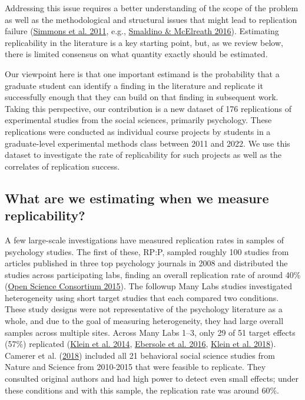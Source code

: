 \documentclass[
  english,
  a4paper,
]{article}
\begin{document}
Addressing this issue requires a better understanding of the scope of the problem as well as the methodological and structural issues that might lead to replication failure (\protect\hyperlink{ref-simmons2011}{Simmons et al. 2011}, e.g., \protect\hyperlink{ref-smaldino2016}{Smaldino \& McElreath 2016}). Estimating replicability in the literature is a key starting point, but, as we review below, there is limited consensus on what quantity exactly should be estimated.

Our viewpoint here is that one important estimand is the probability that a graduate student can identify a finding in the literature and replicate it successfully enough that they can build on that finding in subsequent work. Taking this perspective, our contribution is a new dataset of 176 replications of experimental studies from the social sciences, primarily psychology. These replications were conducted as individual course projects by students in a graduate-level experimental methods class between 2011 and 2022. We use this dataset to investigate the rate of replicability for such projects as well as the correlates of replication success.

\hypertarget{what-are-we-estimating-when-we-measure-replicability}{%
\subsection{What are we estimating when we measure replicability?}\label{what-are-we-estimating-when-we-measure-replicability}}

A few large-scale investigations have measured replication rates in samples of psychology studies. The first of these, RP:P, sampled roughly 100 studies from articles published in three top psychology journals in 2008 and distributed the studies across participating labs, finding an overall replication rate of around 40\% (\protect\hyperlink{ref-openscienceconsortium2015}{Open Science Consortium 2015}). The followup Many Labs studies investigated heterogeneity using short target studies that each compared two conditions. These study designs were not representative of the psychology literature as a whole, and due to the goal of measuring heterogeneity, they had large overall samples across multiple sites. Across Many Labs 1--3, only 29 of 51 target effects (57\%) replicated (\protect\hyperlink{ref-klein2014}{Klein et al. 2014}, \protect\hyperlink{ref-ebersole2016}{Ebersole et al. 2016}, \protect\hyperlink{ref-klein2018}{Klein et al. 2018}). Camerer et al. (\protect\hyperlink{ref-camerer2018}{2018}) included all 21 behavioral social science studies from Nature and Science from 2010-2015 that were feasible to replicate. They consulted original authors and had high power to detect even small effects; under these conditions and with this sample, the replication rate was around 60\%.
\end{document}
